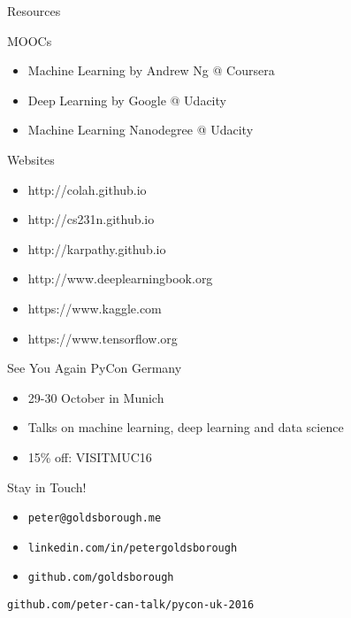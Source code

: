 

\begin{slide}{Resources}
  \begin{itemize}
    \pitem MOOCs
    \begin{itemize}
      \item Machine Learning by Andrew Ng @ Coursera
      \item Deep Learning by Google @ Udacity
      \item Machine Learning Nanodegree @ Udacity
    \end{itemize}
    \pitem Websites
    \begin{itemize}
      \item http://colah.github.io
      \item http://cs231n.github.io
      \item http://karpathy.github.io
      \item http://www.deeplearningbook.org
      \item https://www.kaggle.com
      \item https://www.tensorflow.org
    \end{itemize}
  \end{itemize}
\end{slide}

\begin{slide}{See You Again}
  {\huge PyCon Germany}\\
  \vspace{1cm}

  \begin{itemize}
    \item 29-30 October in Munich
    \item Talks on machine learning, deep learning and data science
    \item 15\% off: VISITMUC16
  \end{itemize}
\end{slide}

\begin{slide}{}
  {\huge Stay in Touch!}\\
  \vspace{1cm}
  \begin{itemize}
    \item \texttt{peter@goldsborough.me}
    \item \texttt{linkedin.com/in/petergoldsborough}
    \item \texttt{github.com/goldsborough}
  \end{itemize}

  \pause
  \vspace{1cm}
  \texttt{github.com/peter-can-talk/pycon-uk-2016}
\end{slide}

